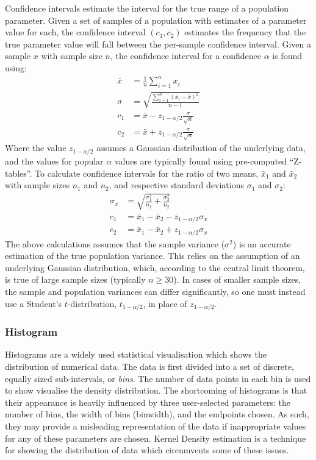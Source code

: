 Confidence intervals estimate the interval for the true range of a
population parameter. Given a set of samples of a population with
estimates of a parameter value for each, the confidence interval
$(c_1,c_2)$ estimates the frequency that the true parameter value will
fall between the per-sample confidence interval. Given a sample $x$
with sample size $n$, the confidence interval for a confidence
$\alpha$ is found using:
%
\begin{align}
  \bar{x} &= \frac{1}{n}\sum_{i=1}^{n} x_i\\
  \sigma &= \sqrt{\frac{\sum_{i=1}^{n}(x_i - \bar{x})^2}{n - 1}}\\
  c_1 &= \bar{x} - z_{1-\alpha/2}\frac{\sigma}{\sqrt{n}}\\
  c_2 &= \bar{x} + z_{1-\alpha/2}\frac{\sigma}{\sqrt{n}}
\end{align}
%
Where the value $z_{1-\alpha/2}$ assumes a Gaussian distribution of
the underlying data, and the values for popular $\alpha$ values are
typically found using pre-computed ``Z-tables''. To calculate
confidence intervals for the ratio of two means, $\bar{x}_1$ and
$\bar{x}_2$ with sample sizes $n_1$ and $n_2$, and respective standard
deviations $\sigma_1$ and $\sigma_2$:
%
\begin{align}
  \sigma_x &= \sqrt{\frac{\sigma_1^2}{n_1} + \frac{\sigma_2^2}{n_2}}\\
  c_1 &= \bar{x}_1 - \bar{x}_2 - z_{1-\alpha/2}\sigma_x\\
  c_2 &= \bar{x}_1 - \bar{x}_2 + z_{1-\alpha/2}\sigma_x
\end{align}
%
The above calculations assumes that the sample variance ($\sigma^2$)
is an accurate estimation of the true population variance. This relies
on the assumption of an underlying Gaussian distribution, which,
according to the central limit theorem, is true of large sample sizes
(typically $n \ge 30$).  In cases of smaller sample sizes, the sample
and population variances can differ significantly, so one must instead
use a Student's $t$-distribution, $t_{1-\alpha/2}$, in place of
$z_{1-\alpha/2}$.


\subsubsection{Histogram}

Histograms are a widely used statistical visualisation which shows the
distribution of numerical data. The data is first divided into a set
of discrete, equally sized sub-intervals, or \emph{bins}. The number
of data points in each bin is used to show visualise the density
distribution. The shortcoming of histograms is that their appearance
is heavily influenced by three user-selected parameters: the number of
bins, the width of bins (binwidth), and the endpoints chosen. As such,
they may provide a misleading representation of the data if
inappropriate values for any of these parameters are chosen. Kernel
Density estimation is a technique for showing the distribution of data
which circumvents some of these issues.


